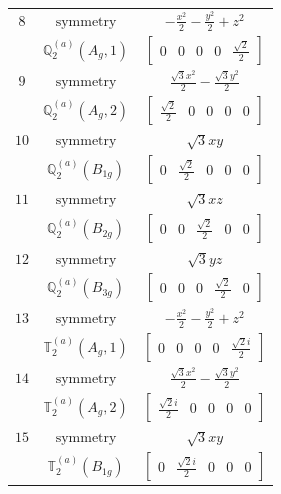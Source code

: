 \documentclass[fleqn,8pt,landscape]{jsarticle}
\begin{document}
\begin{longtable}{ccc}
$ 8 $ & $ \text{symmetry} $ & $ - \frac{x^{2}}{2} - \frac{y^{2}}{2} + z^{2} $ \\
$  $ & $ \mathbb{Q}_{2}^{(a)}(A_{g},1) $ & $ \begin{bmatrix} 0 & 0 & 0 & 0 & \frac{\sqrt{2}}{2} \end{bmatrix} $ \\ \hline
$ 9 $ & $ \text{symmetry} $ & $ \frac{\sqrt{3} x^{2}}{2} - \frac{\sqrt{3} y^{2}}{2} $ \\
$  $ & $ \mathbb{Q}_{2}^{(a)}(A_{g},2) $ & $ \begin{bmatrix} \frac{\sqrt{2}}{2} & 0 & 0 & 0 & 0 \end{bmatrix} $ \\ \hline
$ 10 $ & $ \text{symmetry} $ & $ \sqrt{3} x y $ \\
$  $ & $ \mathbb{Q}_{2}^{(a)}(B_{1g}) $ & $ \begin{bmatrix} 0 & \frac{\sqrt{2}}{2} & 0 & 0 & 0 \end{bmatrix} $ \\ \hline
$ 11 $ & $ \text{symmetry} $ & $ \sqrt{3} x z $ \\
$  $ & $ \mathbb{Q}_{2}^{(a)}(B_{2g}) $ & $ \begin{bmatrix} 0 & 0 & \frac{\sqrt{2}}{2} & 0 & 0 \end{bmatrix} $ \\ \hline
$ 12 $ & $ \text{symmetry} $ & $ \sqrt{3} y z $ \\
$  $ & $ \mathbb{Q}_{2}^{(a)}(B_{3g}) $ & $ \begin{bmatrix} 0 & 0 & 0 & \frac{\sqrt{2}}{2} & 0 \end{bmatrix} $ \\ \hline
$ 13 $ & $ \text{symmetry} $ & $ - \frac{x^{2}}{2} - \frac{y^{2}}{2} + z^{2} $ \\
$  $ & $ \mathbb{T}_{2}^{(a)}(A_{g},1) $ & $ \begin{bmatrix} 0 & 0 & 0 & 0 & \frac{\sqrt{2} i}{2} \end{bmatrix} $ \\ \hline
$ 14 $ & $ \text{symmetry} $ & $ \frac{\sqrt{3} x^{2}}{2} - \frac{\sqrt{3} y^{2}}{2} $ \\
$  $ & $ \mathbb{T}_{2}^{(a)}(A_{g},2) $ & $ \begin{bmatrix} \frac{\sqrt{2} i}{2} & 0 & 0 & 0 & 0 \end{bmatrix} $ \\ \hline
$ 15 $ & $ \text{symmetry} $ & $ \sqrt{3} x y $ \\
$  $ & $ \mathbb{T}_{2}^{(a)}(B_{1g}) $ & $ \begin{bmatrix} 0 & \frac{\sqrt{2} i}{2} & 0 & 0 & 0 \end{bmatrix} $ \\ \hline

\end{longtable}
\end{document}
